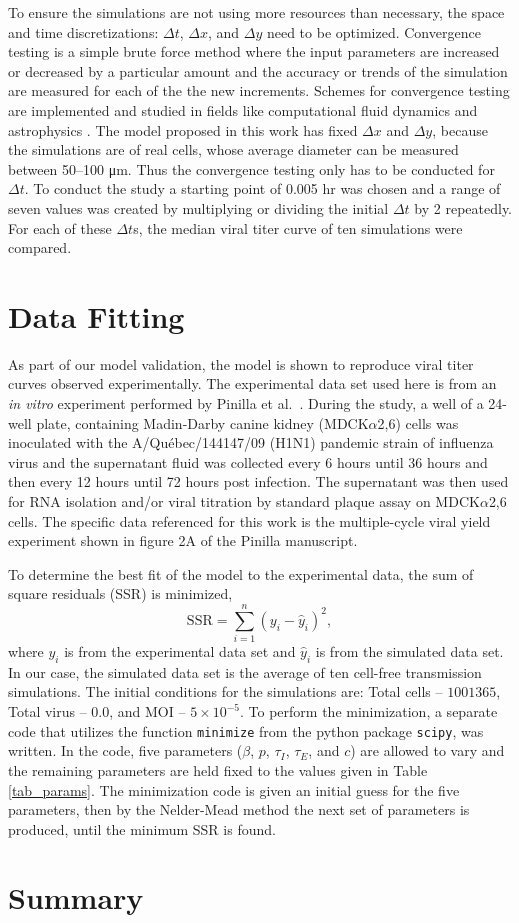To ensure the simulations are not using more resources than necessary, the space and time discretizations: $\Delta t$, $\Delta x$, and $\Delta y$ need to be optimized. Convergence testing is a simple brute force method where the input parameters are increased or decreased by a particular amount and the accuracy or trends of the simulation are measured for each of the the new increments. Schemes for convergence testing are implemented and studied in fields like computational fluid dynamics \citep{bermejo16,kim20fluid} and astrophysics \citep{xu21,banei21}. The model proposed in this work has fixed $\Delta x$ and $\Delta y$, because the simulations are of real cells, whose average diameter can be measured between \numrange[range-phrase = --]{50}{100} \si{\micro\meter}. Thus the convergence testing only has to be conducted for $\Delta t$. To conduct the study a starting point of 0.005 hr was chosen and a range of seven values was created by multiplying or dividing the initial $\Delta t$ by 2 repeatedly. For each of these $\Delta t$s, the median viral titer curve of ten simulations were compared.

\section{Data Fitting} \label{Data_Fitting}

As part of our model validation, the model is shown to reproduce viral titer curves observed experimentally. The experimental data set used here is from an \emph{in vitro} experiment performed by Pinilla et al.\ \citep{pinilla12}. During the study, a well of a 24-well plate, containing Madin-Darby canine kidney (MDCK$\alpha$2,6) cells was inoculated with the A/Qu\'{e}bec/144147/09 (H1N1) pandemic strain of influenza virus and the supernatant fluid was collected every 6 hours until 36 hours and then every 12 hours until 72 hours post infection. The supernatant was then used for RNA isolation and/or viral titration by standard plaque assay on MDCK$\alpha$2,6 cells. The specific data referenced for this work is the multiple-cycle viral yield experiment shown in figure 2A of the Pinilla manuscript.

To determine the best fit of the model to the experimental data, the sum of square residuals (SSR) is minimized, $$\mathrm{SSR} = \sum_{i=1}^{n} (y_i - \hat y_i)^{2},$$ where $y_i$ is from the experimental data set and $\hat y_i$ is from the simulated data set. In our case, the simulated data set is the average of ten cell-free transmission simulations. The initial conditions for the simulations are: Total cells -- $1001365$, Total virus -- $0.0$, and MOI -- $5\times 10^{-5}$. To perform the minimization, a separate code that utilizes the function \texttt{minimize} from the python package \texttt{scipy}, was written. In the code, five parameters ($\beta$, $p$, $\tau_I$, $\tau_E$, and $c$) are allowed to vary and the remaining parameters are held fixed to the values given in Table \ref{tab_params}. The minimization code is given an initial guess for the five parameters, then by the Nelder-Mead method the next set of parameters is produced, until the minimum SSR is found.

\section{Summary}


